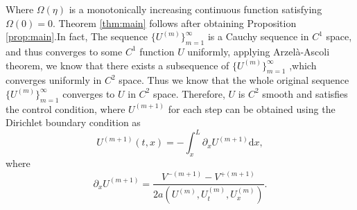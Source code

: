 \documentclass[a4paper,reqno,11pt]{amsart}
\numberwithin{equation}{section} %
\begin{document}
Where  $\Omega(\eta)$ is a monotonically increasing continuous function satisfying $\Omega(0)=0$.
Theorem \ref{thm:main} follows after obtaining Proposition \ref{prop:main}.In fact, The sequence $\{U ^{(m)}\} _{m=1} ^ \infty $ is a Cauchy sequence in $C^1$ space, and thus converges to some $C^1$ function $ U$ uniformly, applying Arzelà-Ascoli theorem, we know that there exists a subsequence of $\{U ^{(m)}\} _{m=1} ^\infty $ ,which converges uniformly in $C^2$ space. Thus we know that the whole original sequence$\{U ^{(m)}\} _{m=1} ^\infty $ converges to $U$ in $C^2$ space. Therefore, $U$ is $C^2$ smooth and satisfies the control condition, where $U^(m+1)$ for each step can be 
obtained using the Dirichlet boundary condition as
$$
U^{(m+1)}(t,x)=-\int_x^L \partial _x U^{(m+1)} \text{d} x,
$$
where
$$
\partial _x U^{(m+1)}=\frac{V^{-\left( m+1 \right) }-V^{+\left( m+1 \right)}}{ 2a\left({U}^{\left( m \right)} ,U_{t}^{\left( m \right)},U_{x}^{\left( m \right)} \right)}.
$$
\end{document}
